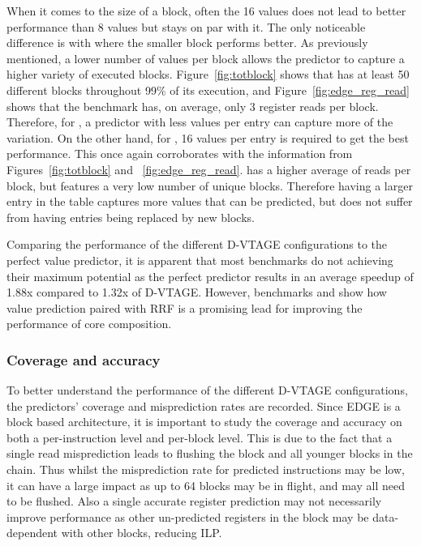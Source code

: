 When it comes to the size of a block, often the 16 values does not lead to better performance than 8 values but stays on par with it.
The only noticeable difference is with  where the smaller block performs better.
As previously mentioned, a lower number of values per block allows the predictor to capture a higher variety of executed blocks.
Figure~\ref{fig:totblock} shows that  has at least 50 different blocks throughout 99\% of its execution, and Figure~\ref{fig:edge_reg_read} shows that the benchmark has, on average, only 3 register reads per block.
Therefore, for , a predictor with less values per entry can capture more of the variation.
On the other hand, for , 16 values per entry is required to get the best performance.
This once again corroborates with the information from Figures~\ref{fig:totblock} and ~\ref{fig:edge_reg_read}.
 has a higher average of reads per block, but features a very low number of unique blocks.
Therefore having a larger entry in the table captures more values that can be predicted, but does not suffer from having entries being replaced by new blocks.

Comparing the performance of the different D-VTAGE configurations to the perfect value predictor, it is apparent that most benchmarks do not achieving their maximum potential as the perfect predictor results in an average speedup of 1.88x compared to 1.32x of D-VTAGE.
However, benchmarks  and  show how value prediction paired with RRF is a promising lead for improving the performance of core composition.

\subsubsection{Coverage and accuracy}
To better understand the performance of the different D-VTAGE configurations, the predictors' coverage and misprediction rates are recorded.
Since EDGE is a block based architecture, it is important to study the coverage and accuracy on both a per-instruction level and per-block level.
This is due to the fact that a single read misprediction leads to flushing the block and all younger blocks in the chain.
Thus whilst the misprediction rate for predicted instructions may be low, it can have a large impact as up to 64 blocks may be in flight, and may all need to be flushed.
Also a single accurate register prediction may not necessarily improve performance as other un-predicted registers in the block may be data-dependent with other blocks, reducing ILP.

